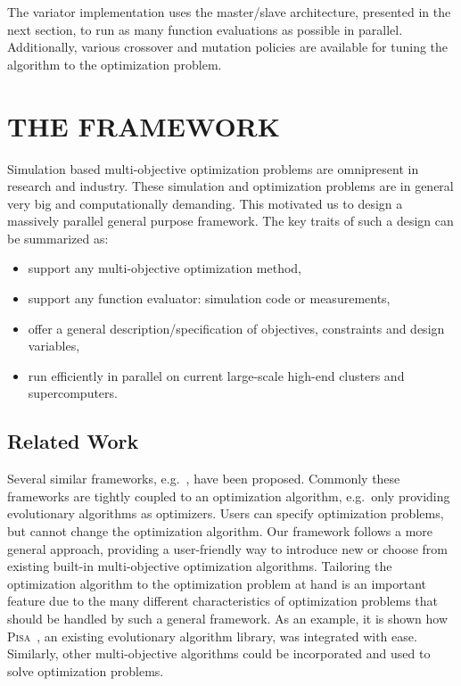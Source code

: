 \documentclass[preprint,linenumbers,amsmath,amssymb,aps,prstab]{revtex4-1}%
\begin{document}
The variator implementation uses the master/slave architecture, presented in
  the next section, to run as many function evaluations as possible in parallel.
Additionally, various crossover and mutation policies are available for tuning
  the algorithm to the optimization problem.



\section{THE FRAMEWORK} \label{sec:framework}

Simulation based multi-objective optimization problems are omnipresent in
  research and industry.
These simulation and optimization problems are in
  general very big and computationally demanding.
This motivated us to design a massively parallel general purpose framework.
The key traits of such a design can be summarized as:
%
\begin{itemize}
  \item support any multi-objective optimization method,
  \item support any function evaluator: simulation code or measurements,
  \item offer a general description/specification of objectives, constraints
        and design variables,
  \item run efficiently in parallel on current large-scale high-end clusters
        and supercomputers.
\end{itemize}

\subsection{Related Work}

Several similar frameworks, e.g.~\cite{dnld:06, lbjt:07, fide:09,lems:09}, have
  been proposed.
Commonly these frameworks are tightly coupled to an optimization algorithm,
  e.g.\ only providing evolutionary algorithms as optimizers.
Users can specify optimization problems, but cannot change the
  optimization algorithm.
Our framework follows a more general approach, providing a user-friendly way
  to introduce new or choose from existing built-in multi-objective
  optimization algorithms.
Tailoring the optimization algorithm to the optimization problem at hand is
  an important feature due to the many different characteristics of
  optimization problems that should be handled by such a general framework.
As an example, it is shown how \textsc{Pisa}~\cite{pisa}, an existing evolutionary
  algorithm library, was integrated with ease.
Similarly, other multi-objective algorithms could be incorporated and
  used to solve optimization problems.
\end{document}
